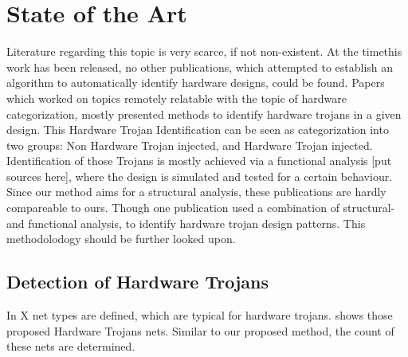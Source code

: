 
\section{State of the Art}
Literature regarding this topic is very scarce, if not non-existent. At the timethis work has been released, no other publications, which attempted to establish 
an algorithm to automatically identify hardware designs, could be found.
Papers which worked on topics remotely relatable with the topic of hardware 
categorization, mostly presented methods to identify hardware trojans in a given 
design. This Hardware Trojan Identification can be seen as categorization into 
two groups: Non Hardware Trojan injected, and Hardware Trojan injected.
Identification of those Trojans is mostly achieved via a functional analysis [put sources here], where the design is simulated and tested for a certain
behaviour. Since our method aims for a structural analysis, these publications 
are hardly compareable to ours. Though one publication used a combination of structural- and 
functional analysis, to identify hardware trojan design patterns. This 
methodolodogy should be further looked upon.  

\subsection{Detection of Hardware Trojans}
In \autocite{Oya2015} X net types are defined, which are typical for hardware trojans.
\label{hwTrojanNets} shows those proposed Hardware Trojans nets. Similar to 
our proposed method, the count of these nets are determined. 
 
